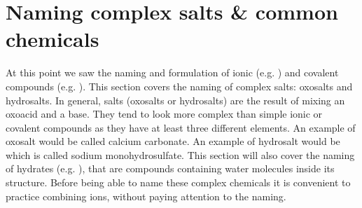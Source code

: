 \documentclass[main.tex]{subfiles}
\begin{document}
\section{Naming complex salts  \& common chemicals}
At this point we saw the naming and formulation of ionic (e.g. ) and covalent compounds (e.g. ). This section covers the naming of complex salts: oxosalts and hydrosalts. In general, salts (oxosalts or hydrosalts) are the result of mixing an oxoacid and a base. They tend to look more complex than simple ionic or covalent compounds as they have at least three different elements. An example of oxosalt would be  called calcium carbonate. An example of hydrosalt would be  which is called sodium monohydrosulfate. This section will also cover the naming of hydrates (e.g. ), that are compounds containing water molecules inside its structure. Before being able to name these complex chemicals it is convenient to practice combining ions, without paying attention to the naming.
\sloppy 
\end{document}
